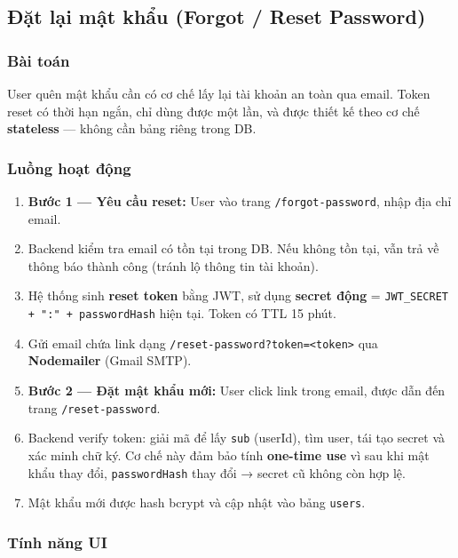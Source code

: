 \documentclass[12pt,a4paper]{article}
\begin{document}
\subsection{Đặt lại mật khẩu (Forgot / Reset Password)}

\subsubsection{Bài toán}

User quên mật khẩu cần có cơ chế lấy lại tài khoản an toàn qua email.
Token reset có thời hạn ngắn, chỉ dùng được một lần, và được thiết kế theo
cơ chế \textbf{stateless} --- không cần bảng riêng trong DB.

\subsubsection{Luồng hoạt động}

\begin{enumerate}
  \item \textbf{Bước 1 --- Yêu cầu reset:} User vào trang
        \texttt{/forgot-password}, nhập địa chỉ email.
  \item Backend kiểm tra email có tồn tại trong DB. Nếu không tồn tại,
        vẫn trả về thông báo thành công (tránh lộ thông tin tài khoản).
  \item Hệ thống sinh \textbf{reset token} bằng JWT, sử dụng
        \textbf{secret động} = \texttt{JWT\_SECRET + ":" + passwordHash}
        hiện tại. Token có TTL 15 phút.
  \item Gửi email chứa link dạng
        \texttt{/reset-password?token=\textless token\textgreater}
        qua \textbf{Nodemailer} (Gmail SMTP).
  \item \textbf{Bước 2 --- Đặt mật khẩu mới:} User click link trong
        email, được dẫn đến trang \texttt{/reset-password}.
  \item Backend verify token: giải mã để lấy \texttt{sub} (userId), tìm
        user, tái tạo secret và xác minh chữ ký. Cơ chế này đảm bảo
        tính \textbf{one-time use} vì sau khi mật khẩu thay đổi,
        \texttt{passwordHash} thay đổi → secret cũ không còn hợp lệ.
  \item Mật khẩu mới được hash bcrypt và cập nhật vào bảng \texttt{users}.
\end{enumerate}

\subsubsection{Tính năng UI}
\end{document}
